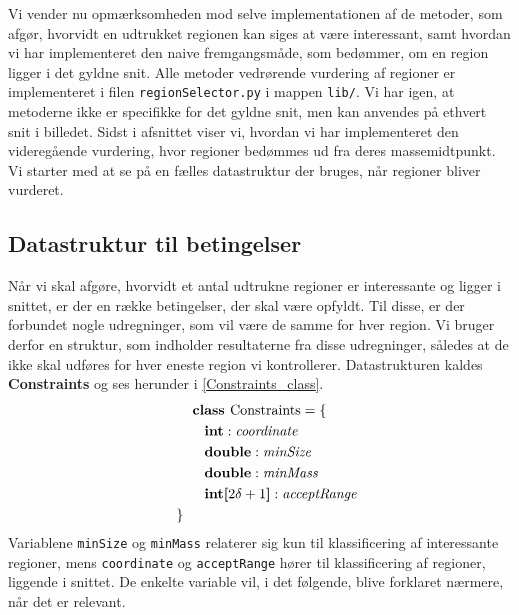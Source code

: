 {
{\sffamily Vi vender nu opmærksomheden mod selve implementationen af de
metoder, som afgør, hvorvidt en udtrukket regionen kan siges at være
interessant, samt hvordan vi har implementeret den naive fremgangsmåde,
som bedømmer, om en region ligger i det gyldne snit. Alle metoder
vedrørende vurdering af regioner er implementeret i filen
\texttt{regionSelector.py} i mappen \texttt{lib/}.  Vi har igen, at
metoderne ikke er specifikke for det gyldne snit, men kan anvendes på
ethvert snit i billedet. Sidst i afsnittet viser vi, hvordan vi har
implementeret den videregående vurdering, hvor regioner bedømmes ud fra
deres massemidtpunkt. Vi starter med at se på en fælles datastruktur der
bruges, når regioner bliver vurderet.
}

\subsection{Datastruktur til betingelser}
Når vi skal afgøre, hvorvidt et antal udtrukne regioner er interessante
og ligger i snittet, er der en række betingelser, der skal være opfyldt.
Til disse, er der forbundet nogle udregninger, som vil være de samme for
hver region. Vi bruger derfor en struktur, som indholder resultaterne
fra disse udregninger, således at de ikke skal udføres for hver eneste
region vi kontrollerer. Datastrukturen kaldes \textbf{Constraints} og
ses herunder i \eqref{Constraints_class}.
\begin{multline}
    \textbf{class~} \textrm{Constraints} = \{ \\
    \shoveleft{\qquad\textbf{int} : \textit{coordinate}} \\
    \shoveleft{\qquad\textbf{double} : \textit{minSize}} \\
    \shoveleft{\qquad\textbf{double} : \textit{minMass}} \\
    \shoveleft{\qquad\textbf{int[}2\delta + 1\textbf{]} : \textit{acceptRange}} \\
    \shoveleft{\}}\shoveright{}
    \label{Constraints_class}
\end{multline}
Variablene \texttt{minSize} og \texttt{minMass} relaterer sig kun til
klassificering af interessante regioner, mens \texttt{coordinate} og
\texttt{acceptRange} hører til klassificering af regioner, liggende i
snittet. De enkelte variable vil, i det følgende, blive forklaret
nærmere, når det er relevant.

}

